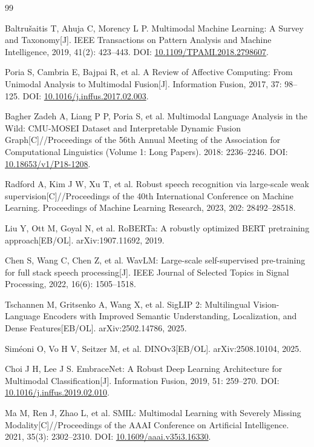 {\normalfont\songti\normalsize
\begin{thebibliography}{99}
\setlength{\itemsep}{3.9bp}
\setlength{\parsep}{0pt}

 Baltru\v{s}aitis T, Ahuja C, Morency L P. Multimodal Machine Learning: A Survey and Taxonomy[J]. IEEE Transactions on Pattern Analysis and Machine Intelligence, 2019, 41(2): 423--443. DOI: \url{10.1109/TPAMI.2018.2798607}.

 Poria S, Cambria E, Bajpai R, et al. A Review of Affective Computing: From Unimodal Analysis to Multimodal Fusion[J]. Information Fusion, 2017, 37: 98--125. DOI: \url{10.1016/j.inffus.2017.02.003}.

 Bagher Zadeh A, Liang P P, Poria S, et al. Multimodal Language Analysis in the Wild: CMU-MOSEI Dataset and Interpretable Dynamic Fusion Graph[C]//Proceedings of the 56th Annual Meeting of the Association for Computational Linguistics (Volume 1: Long Papers). 2018: 2236--2246. DOI: \url{10.18653/v1/P18-1208}.

 Radford A, Kim J W, Xu T, et al. Robust speech recognition via large-scale weak supervision[C]//Proceedings of the 40th International Conference on Machine Learning. Proceedings of Machine Learning Research, 2023, 202: 28492--28518.

 Liu Y, Ott M, Goyal N, et al. RoBERTa: A robustly optimized BERT pretraining approach[EB/OL]. arXiv:1907.11692, 2019.

 Chen S, Wang C, Chen Z, et al. WavLM: Large-scale self-supervised pre-training for full stack speech processing[J]. IEEE Journal of Selected Topics in Signal Processing, 2022, 16(6): 1505--1518.

Tschannen M, Gritsenko A, Wang X, et al. SigLIP 2: Multilingual Vision-Language Encoders with Improved Semantic Understanding, Localization, and Dense Features[EB/OL]. arXiv:2502.14786, 2025.

Sim{\'e}oni O, Vo H V, Seitzer M, et al. DINOv3[EB/OL]. arXiv:2508.10104, 2025.

 Choi J H, Lee J S. EmbraceNet: A Robust Deep Learning Architecture for Multimodal Classification[J]. Information Fusion, 2019, 51: 259--270. DOI: \url{10.1016/j.inffus.2019.02.010}.

 Ma M, Ren J, Zhao L, et al. SMIL: Multimodal Learning with Severely Missing Modality[C]//Proceedings of the AAAI Conference on Artificial Intelligence. 2021, 35(3): 2302--2310. DOI: \url{10.1609/aaai.v35i3.16330}.


\end{thebibliography}}
